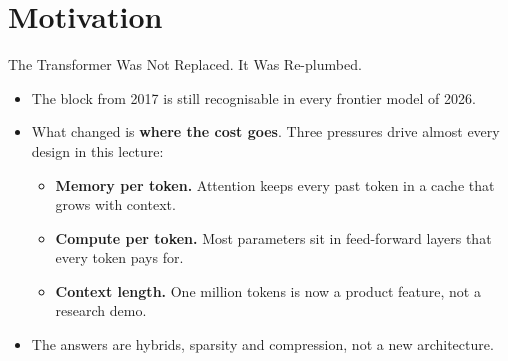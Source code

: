 \section{Motivation}

\begin{frame}{The Transformer Was Not Replaced. It Was Re-plumbed.}
    \begin{itemize}\itemsep0.6em
        \item The block from 2017 is still recognisable in every frontier model of 2026.
        \item What changed is \textbf{where the cost goes}. Three pressures drive almost every design in this lecture:
        \begin{itemize}\itemsep0.3em
            \item \textbf{Memory per token.} Attention keeps every past token in a cache that grows with context.
            \item \textbf{Compute per token.} Most parameters sit in feed-forward layers that every token pays for.
            \item \textbf{Context length.} One million tokens is now a product feature, not a research demo.
        \end{itemize}
        \item The answers are \alert{hybrids}, \alert{sparsity} and \alert{compression}, not a new architecture.
    \end{itemize}
    \vspace{0.4em}
\end{frame}

